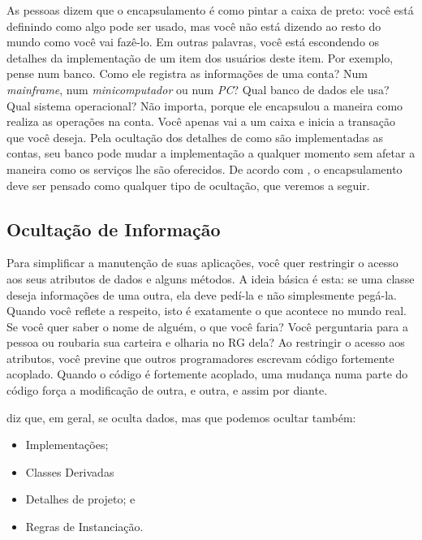 \documentclass[
	11pt,				%
	openright,
	twoside,			%
	a4paper,			%
	english,			%
	french,
	brazil,				%
	sumario=tradicional
	]{abntex2}
\begin{document}
As pessoas dizem que o encapsulamento é como pintar a caixa de preto: você está definindo como algo pode ser usado, mas você não está dizendo ao resto do mundo como você vai fazê-lo. Em outras palavras, você está escondendo os detalhes da implementação de um item dos usuários deste item. Por exemplo, pense num banco. Como ele registra as informações de uma conta? Num \textit{mainframe}, num \textit{minicomputador} ou num \textit{PC}? Qual banco de dados ele usa? Qual sistema operacional? Não importa, porque ele encapsulou a maneira como realiza as operações na conta. Você apenas vai a um caixa e inicia a transação que você deseja. Pela ocultação dos detalhes de como são implementadas as contas, seu banco pode mudar a implementação a qualquer momento sem afetar a maneira como os serviços lhe são oferecidos. De acordo com \cite{DP:explained}, o encapsulamento deve ser pensado como qualquer tipo de ocultação, que veremos a seguir.

\subsection{Ocultação de Informação}

Para simplificar a manutenção de suas aplicações, você quer restringir o acesso aos seus atributos de dados e alguns métodos. A ideia básica é esta: se uma classe deseja informações de uma outra, ela deve pedí-la e não simplesmente pegá-la. Quando você reflete a respeito, isto é exatamente o que acontece no mundo real. Se você quer saber o nome de alguém, o que você faria? Você perguntaria para a pessoa ou roubaria sua carteira e olharia no RG dela? Ao restringir o acesso aos atributos, você previne que outros programadores escrevam código fortemente acoplado. Quando o código é fortemente acoplado, uma mudança numa parte do código força a modificação de outra, e outra, e assim por diante.

\cite{DP:explained} diz que, em geral, se oculta dados, mas que podemos ocultar também:
\begin{itemize}
\item Implementações;
\item Classes Derivadas
\item Detalhes de projeto; e
\item Regras de Instanciação.
\end{itemize}

\end{document}
